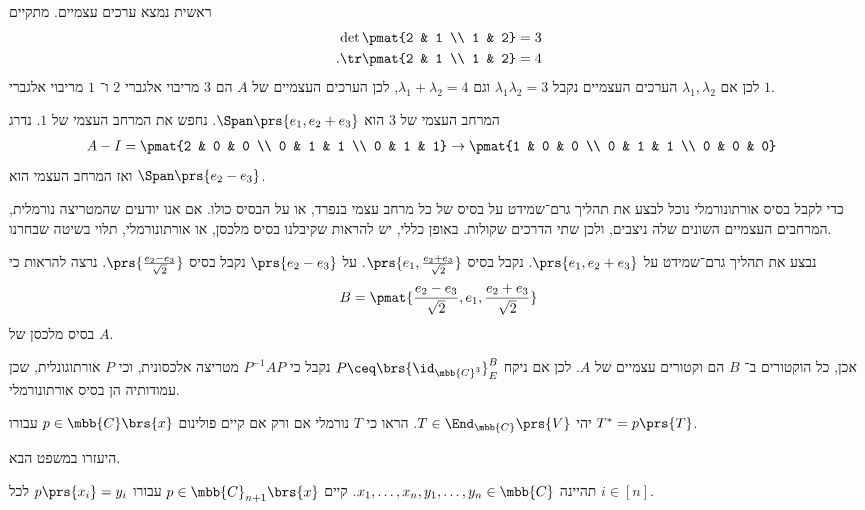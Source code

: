 \documentclass[a4paper,10pt,twoside,openany]{book}
\begin{document}
\begin{solution}
ראשית נמצא ערכים עצמיים. מתקיים
\begin{align*}
\det\pmat{2 & 1 \\ 1 & 2} &= 3 \\
\text{.} \tr\pmat{2 & 1 \\ 1 & 2} &= 4 
\end{align*}
לכן אם
$\lambda_1, \lambda_2$
הערכים העצמיים נקבל
$\lambda_1 \lambda_2 = 3$
וגם
$\lambda_1 + \lambda_2 = 4$,
לכן הערכים העצמיים של
$A$
הם
$3$
מריבוי אלגברי
$2$
ו־%
$1$
מריבוי אלגברי
$1$.

המרחב העצמי של
$3$
הוא
$\Span\prs{e_1, e_2 + e_3}$.
נחפש את המרחב העצמי של
$1$.
נדרג
\begin{align*}
A - I &= \pmat{2 & 0 & 0 \\ 0 & 1 & 1 \\ 0 & 1 & 1}
\to \pmat{1 & 0 & 0 \\ 0 & 1 & 1 \\ 0 & 0 & 0}
\end{align*}
ואז המרחב העצמי הוא
$\Span\prs{e_2 - e_3}$.

כדי לקבל בסיס אורתונורמלי נוכל לבצע את תהליך גרם־שמידט על בסיס של כל מרחב עצמי בנפרד, או על הבסיס כולו. אם אנו יודעים שהמטריצה נורמלית, המרחבים העצמיים השונים שלה ניצבים, ולכן שתי הדרכים שקולות. באופן כללי, יש להראות שקיבלנו בסיס מלכסן, או אורתונורמלי, תלוי בשיטה שבחרנו.

נבצע את תהליך גרם־שמידט על
$\prs{e_1, e_2+e_3}$.
נקבל בסיס
$\prs{e_1, \frac{e_2 + e_3}{\sqrt{2}}}$.
על
$\prs{e_2 - e_3}$
נקבל בסיס
$\prs{\frac{e_2 - e_3}{\sqrt{2}}}$.
נרצה להראות כי
\[B = \pmat{\frac{e_2 - e_3}{\sqrt{2}}, e_1, \frac{e_2 + e_3}{\sqrt{2}}}\]
בסיס מלכסן של
$A$.

אכן, כל הוקטורים ב־%
$B$
הם וקטורים עצמיים של
$A$.
לכן אם ניקח
$P \ceq \brs{\id_{\mbb{C}^3}}^B_E$
נקבל כי
$P^{-1} A P$
מטריצה אלכסונית, וכי
$P$
אורתוגונלית, שכן עמודותיה הן בסיס אורתונורמלי.
\end{solution}

\begin{exercisechap}
יהי
$T \in \End_{\mbb{C}}\prs{V}$.
הראו כי
$T$
נורמלי אם ורק אם קיים פולינום
$p \in \mbb{C}\brs{x}$
עבורו
$T^* = p\prs{T}$.

היעזרו במשפט הבא.

\begin{theorem}
תהיינה
$x_1, \ldots, x_n, y_1, \ldots, y_n \in \mbb{C}$.
קיים
$p \in \mbb{C}_{n+1}\brs{x}$
עבורו
$p\prs{x_i} = y_i$
לכל
$i \in [n]$.
\end{theorem}
\end{exercisechap}
\end{document}

